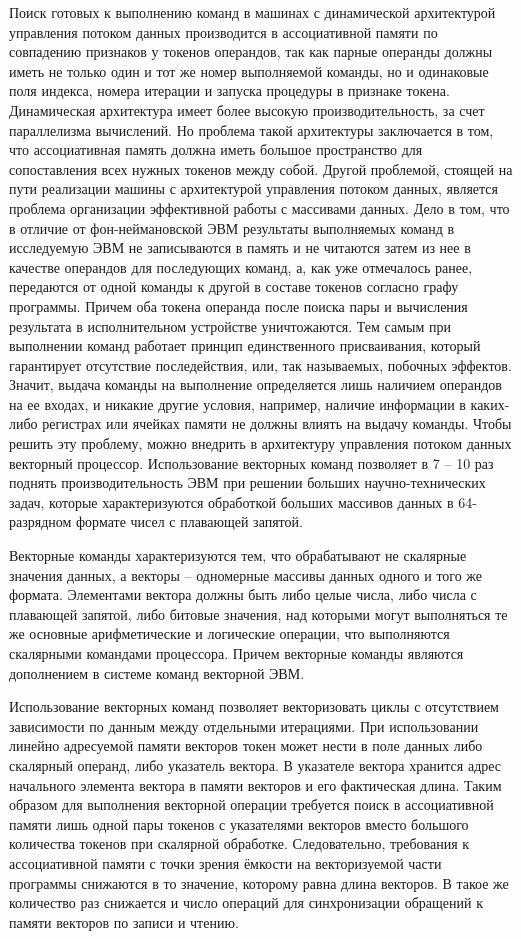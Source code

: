 \documentclass[
11pt,%
tightenlines,%
twoside,%
onecolumn,%
nofloats,%
nobibnotes,%
nofootinbib,%
superscriptaddress,%
noshowpacs,%
centertags]%
{revtex4}
\begin{document}
Поиск готовых к выполнению команд в машинах с динамической архитектурой управления потоком данных производится в ассоциативной памяти по совпадению признаков у токенов операндов, так как парные операнды должны иметь не только один и тот же номер выполняемой команды, но и одинаковые поля индекса, номера итерации и запуска процедуры в признаке токена.
Динамическая архитектура имеет более высокую производительность, за счет параллелизма вычислений. Но проблема такой архитектуры заключается в том, что ассоциативная память должна иметь большое пространство для сопоставления всех нужных токенов между собой.
Другой проблемой, стоящей на пути реализации машины с архитектурой управления потоком данных, является проблема организации эффективной работы с массивами данных. Дело в том, что в отличие от фон-неймановской ЭВМ результаты выполняемых команд в исследуемую ЭВМ не записываются в память и не читаются затем из нее в качестве операндов для последующих команд, а, как уже отмечалось ранее, передаются от одной команды к другой в составе токенов согласно графу программы. Причем оба токена операнда после поиска пары и вычисления результата в исполнительном устройстве уничтожаются. Тем самым при выполнении команд работает принцип единственного присваивания, который гарантирует отсутствие последействия, или, так называемых, побочных эффектов. Значит, выдача команды на выполнение определяется лишь наличием операндов на ее входах, и никакие другие условия, например, наличие информации в каких-либо регистрах или ячейках памяти не должны влиять на выдачу команды. Чтобы решить эту проблему, можно внедрить в архитектуру управления потоком данных векторный процессор. Использование векторных команд позволяет в 7 – 10 раз поднять производительность ЭВМ при решении больших научно-технических задач, которые характеризуются обработкой больших массивов данных в 64-разрядном формате чисел с плавающей запятой.

Векторные команды характеризуются тем, что обрабатывают не скалярные значения данных, а векторы – одномерные массивы данных одного и того же формата. Элементами вектора должны быть либо целые числа, либо числа с плавающей запятой, либо битовые значения, над которыми могут выполняться те же основные арифметические и логические операции, что выполняются скалярными командами процессора. Причем векторные команды являются дополнением в системе команд векторной ЭВМ.

Использование векторных команд позволяет векторизовать циклы с отсутствием зависимости по данным между отдельными итерациями. При использовании линейно адресуемой памяти векторов токен может нести в поле данных либо скалярный операнд, либо указатель вектора. В указателе вектора хранится адрес начального элемента вектора в памяти векторов и его фактическая длина. Таким образом для выполнения векторной операции требуется поиск в ассоциативной памяти лишь одной пары токенов с указателями векторов вместо большого количества токенов при скалярной обработке. Следовательно, требования к ассоциативной памяти с точки зрения ёмкости на векторизуемой части программы снижаются в то значение, которому равна длина векторов. В такое же количество раз снижается и число операций для синхронизации обращений к памяти векторов по записи и чтению.
\end{document}
